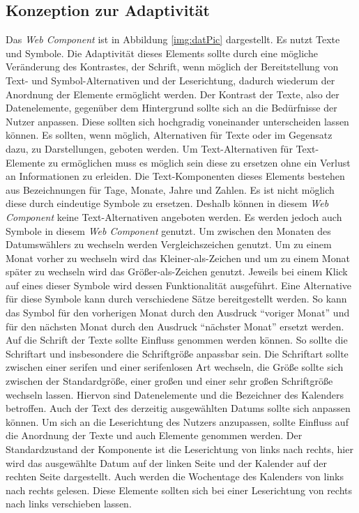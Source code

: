 \documentclass[12pt, paper=a4, bibtotoc, toc=listof, headsepline=true]{scrreprt}
\begin{document}
		\subsection{Konzeption zur Adaptivität}
		Das \emph{Web Component} ist in Abbildung \ref{img:datPic} dargestellt. Es nutzt Texte und Symbole. Die Adaptivität dieses Elements sollte durch eine mögliche Veränderung des Kontrastes, der Schrift, wenn möglich der Bereitstellung von Text- und Symbol-Alternativen und der Leserichtung, dadurch wiederum der Anordnung der Elemente ermöglicht werden.
		\newline
		Der Kontrast der Texte, also der Datenelemente, gegenüber dem Hintergrund sollte sich an die Bedürfnisse der Nutzer anpassen. Diese sollten sich hochgradig voneinander unterscheiden lassen können. 
		Es sollten, wenn möglich, Alternativen für Texte oder im Gegensatz dazu, zu Darstellungen, geboten werden. Um Text-Alternativen für Text-Elemente zu ermöglichen muss es möglich sein diese zu ersetzen ohne ein Verlust an Informationen zu erleiden. Die Text-Komponenten dieses Elements bestehen aus Bezeichnungen für Tage, Monate, Jahre und Zahlen. Es ist nicht möglich diese durch eindeutige Symbole zu ersetzen. Deshalb können in diesem \emph{Web Component} keine Text-Alternativen angeboten werden. Es werden jedoch auch Symbole in diesem \emph{Web Component} genutzt. Um zwischen den Monaten des Datumswählers zu wechseln werden Vergleichszeichen genutzt. Um zu einem Monat vorher zu wechseln wird das Kleiner-als-Zeichen und um zu einem Monat später zu wechseln wird das Größer-als-Zeichen genutzt. Jeweils bei einem Klick auf eines dieser Symbole wird dessen Funktionalität ausgeführt. Eine Alternative für diese Symbole kann durch verschiedene Sätze bereitgestellt werden. So kann das Symbol für den vorherigen Monat durch den Ausdruck \enquote{voriger Monat} und für den nächsten Monat durch den Ausdruck \enquote{nächster Monat} ersetzt werden.
		Auf die Schrift der Texte sollte Einfluss genommen werden können. So sollte die Schriftart und insbesondere die Schriftgröße anpassbar sein. Die Schriftart sollte zwischen einer serifen und einer serifenlosen Art wechseln, die Größe sollte sich zwischen der Standardgröße, einer großen und einer sehr großen Schriftgröße wechseln lassen. Hiervon sind Datenelemente und die Bezeichner des Kalenders betroffen. Auch der Text des derzeitig ausgewählten Datums sollte sich anpassen können.
		Um sich an die Leserichtung des Nutzers anzupassen, sollte Einfluss auf die Anordnung der Texte und auch Elemente genommen werden. Der Standardzustand der Komponente ist die Leserichtung von links nach rechts, hier wird das ausgewählte Datum auf der linken Seite und der Kalender auf der rechten Seite dargestellt. Auch werden die Wochentage des Kalenders von links nach rechts gelesen. Diese Elemente sollten sich bei einer Leserichtung von rechts nach links verschieben lassen.  
\end{document}
